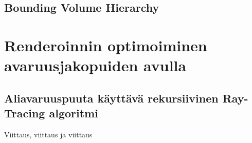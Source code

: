 \documentclass[a4paper,12pt, titlepage]{article}
\theoremstyle{break}
\theoremstyle{algostyle}
\begin{document}
\subsection{Bounding Volume Hierarchy}

\section{Renderoinnin optimoiminen avaruusjakopuiden avulla}
\subsection{Aliavaruuspuuta käyttävä rekursiivinen Ray-Tracing algoritmi}
Viittaus\cite{ranta}, viittaus\cite{hughes} ja viittaus\cite{janke}\cite{rules}\cite{fuchs}
\cite{appel}\cite{samet}



\end{document}
